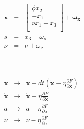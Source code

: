 \documentclass{standalone}
\begin{document}
\Huge
\begin{minipage}[t]{\textwidth}
\begin{minipage}[t]{\textwidth}

$
\begin{array}{ccc}
    \dot{\mathbf{x}} &=&
    \left[\begin{array}{c}
        \phi x_2 \\
        -x_1 \\
        \nu x_1 - x_3 \\
    \end{array}\right] +\boldsymbol{\omega_x}\\
    s &=& x_3 + \omega_s  \\
    \nu &=& \nu + \omega_{\nu}\\
\end{array}
$
\end{minipage}
\vspace{0.1in}
\\
\begin{minipage}[t]{\textwidth}
$
\begin{array}{ccl}
    \boldsymbol{x} &\rightarrow& \boldsymbol{x} + dt\left(\boldsymbol{\dot{x}}
    -\eta\frac{\partial F}{\partial \boldsymbol{x}}\right) \\
    \boldsymbol{\dot{x}} &\rightarrow& \boldsymbol{\dot{x}}
    -\eta\frac{\partial F}{\partial \boldsymbol{\dot{x}}} \\
    a &\rightarrow& a -\eta\frac{\partial F}{\partial a} \\
    \nu &\rightarrow& \nu -\eta\frac{\partial F}{\partial a} \\
\end{array}
$
\end{minipage}
\end{minipage}
\end{document}
